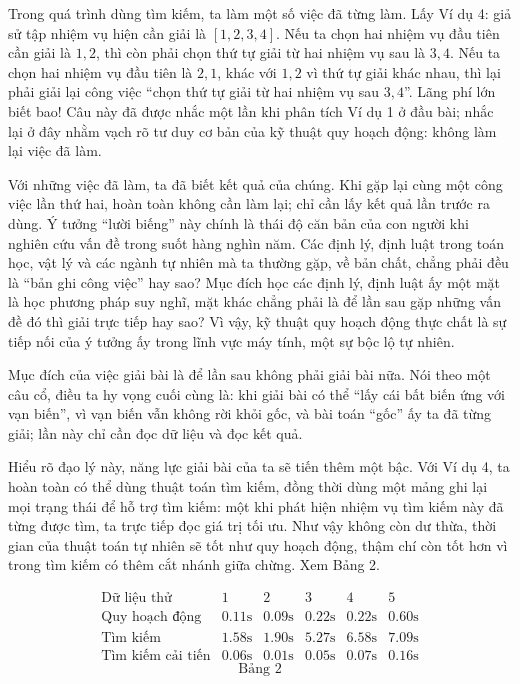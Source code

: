 \documentclass[11pt]{article}
\begin{document}
Trong quá trình dùng tìm kiếm, ta làm một số việc đã từng làm. Lấy Ví dụ 4:
giả sử tập nhiệm vụ hiện cần giải là \([1,2,3,4]\). Nếu ta chọn hai nhiệm vụ
đầu tiên cần giải là \(1,2\), thì còn phải chọn thứ tự giải từ hai nhiệm vụ
sau là \(3,4\). Nếu ta chọn hai nhiệm vụ đầu tiên là \(2,1\), khác với
\(1,2\) vì thứ tự giải khác nhau, thì lại phải giải lại công việc ``chọn thứ
tự giải từ hai nhiệm vụ sau \(3,4\)''. Lãng phí lớn biết bao! Câu này đã được
nhắc một lần khi phân tích Ví dụ 1 ở đầu bài; nhắc lại ở đây nhằm vạch rõ tư
duy cơ bản của kỹ thuật quy hoạch động: không làm lại việc đã làm.

Với những việc đã làm, ta đã biết kết quả của chúng. Khi gặp lại cùng một
công việc lần thứ hai, hoàn toàn không cần làm lại; chỉ cần lấy kết quả lần
trước ra dùng. Ý tưởng ``lười biếng'' này chính là thái độ căn bản của con
người khi nghiên cứu vấn đề trong suốt hàng nghìn năm. Các định lý, định luật
trong toán học, vật lý và các ngành tự nhiên mà ta thường gặp, về bản chất,
chẳng phải đều là ``bản ghi công việc'' hay sao? Mục đích học các định lý,
định luật ấy một mặt là học phương pháp suy nghĩ, mặt khác chẳng phải là để
lần sau gặp những vấn đề đó thì giải trực tiếp hay sao? Vì vậy, kỹ thuật quy
hoạch động thực chất là sự tiếp nối của ý tưởng ấy trong lĩnh vực máy tính,
một sự bộc lộ tự nhiên.

Mục đích của việc giải bài là để lần sau không phải giải bài nữa. Nói theo
một câu cổ, điều ta hy vọng cuối cùng là: khi giải bài có thể ``lấy cái bất
biến ứng với vạn biến'', vì vạn biến vẫn không rời khỏi gốc, và bài toán
``gốc'' ấy ta đã từng giải; lần này chỉ cần đọc dữ liệu và đọc kết quả.

Hiểu rõ đạo lý này, năng lực giải bài của ta sẽ tiến thêm một bậc. Với Ví dụ
4, ta hoàn toàn có thể dùng thuật toán tìm kiếm, đồng thời dùng một mảng ghi
lại mọi trạng thái để hỗ trợ tìm kiếm: một khi phát hiện nhiệm vụ tìm kiếm
này đã từng được tìm, ta trực tiếp đọc giá trị tối ưu. Như vậy không còn dư
thừa, thời gian của thuật toán tự nhiên sẽ tốt như quy hoạch động, thậm chí
còn tốt hơn vì trong tìm kiếm có thêm cắt nhánh giữa chừng. Xem Bảng 2.

\[
\begin{array}{c|ccccc}
\text{Dữ liệu thử} & 1 & 2 & 3 & 4 & 5\\ \hline
\text{Quy hoạch động} & 0.11\text{s} & 0.09\text{s} & 0.22\text{s} &
0.22\text{s} & 0.60\text{s}\\
\text{Tìm kiếm} & 1.58\text{s} & 1.90\text{s} & 5.27\text{s} &
6.58\text{s} & 7.09\text{s}\\
\text{Tìm kiếm cải tiến} & 0.06\text{s} & 0.01\text{s} & 0.05\text{s} &
0.07\text{s} & 0.16\text{s}
\end{array}
\]
\[
\text{Bảng 2}
\]
\end{document}

